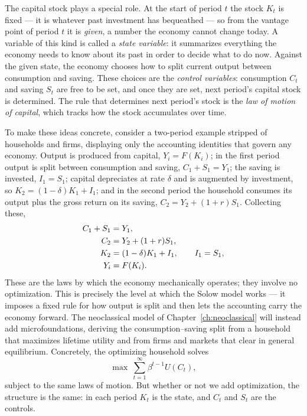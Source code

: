 
The capital stock plays a special role. At the start of period $t$ the stock $K_t$ is fixed --- it is whatever past investment has bequeathed --- so from the vantage point of period $t$ it is \emph{given}, a number the economy cannot change today. A variable of this kind is called a \emph{state variable}: it summarizes everything the economy needs to know about its past in order to decide what to do now. Against the given state, the economy chooses how to split current output between consumption and saving. These choices are the \emph{control variables}: consumption $C_t$ and saving $S_t$ are free to be set, and once they are set, next period's capital stock is determined. The rule that determines next period's stock is the \emph{law of motion of capital}, which tracks how the stock accumulates over time.


To make these ideas concrete, consider a two-period example stripped of households and firms, displaying only the accounting identities that govern any economy. Output is produced from capital, $Y_i = F(K_i)$; in the first period output is split between consumption and saving, $C_1 + S_1 = Y_1$; the saving is invested, $I_1 = S_1$; capital depreciates at rate $\delta$ and is augmented by investment, so $K_2 = (1-\delta)K_1 + I_1$; and in the second period the household consumes its output plus the gross return on its saving, $C_2 = Y_2 + (1+r)S_1$. Collecting these,
\[
\begin{aligned}
C_1 + S_1 &= Y_1, \\
C_2 &= Y_2 + (1+r) S_1, \\
K_2 &= (1-\delta)K_1 + I_1, \qquad I_1 = S_1, \\
Y_i &= F(K_i).
\end{aligned}
\]
These are the laws by which the economy mechanically operates; they involve no optimization. This is precisely the level at which the Solow model works --- it imposes a fixed rule for how output is split and then lets the accounting carry the economy forward. The neoclassical model of Chapter~\ref{ch:neoclassical} will instead add microfoundations, deriving the consumption--saving split from a household that maximizes lifetime utility and from firms and markets that clear in general equilibrium. Concretely, the optimizing household solves
\[
\max \ \sum_{t=1}^{\infty} \beta^{t-1} U(C_t),
\]
subject to the same laws of motion. But whether or not we add optimization, the structure is the same: in each period $K_t$ is the state, and $C_t$ and $S_t$ are the controls.

